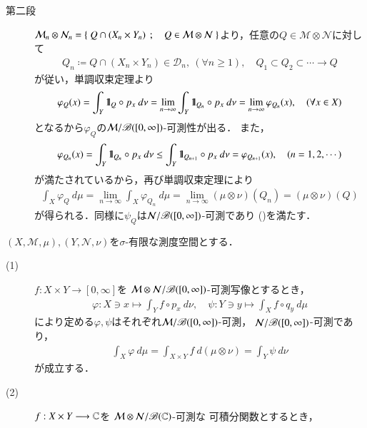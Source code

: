 \begin{prf}
\begin{description}
			\item[第二段]
				$\mathcal{M}_n \otimes \mathcal{N}_n = \left\{\ Q \cap (X_n \times Y_n)\ \, ; \quad Q \in \mathcal{M} \otimes \mathcal{N}\ \right\}$より，任意の$Q \in \mathcal{M} \otimes \mathcal{N}$に対して
				\begin{align}
					Q_n \coloneqq Q \cap (X_n \times Y_n) \in \mathcal{D}_n,
					\ (\forall n \geq 1),
					\quad Q_1 \subset Q_2 \subset \cdots \longrightarrow Q
				\end{align}
				が従い，単調収束定理より
				\begin{align}
					\varphi_Q(x) = \int_Y \mbox{1}\hspace{-0.25em}\mbox{l}_Q \circ p_x\ d\nu
					= \lim_{n \to \infty} \int_Y \mbox{1}\hspace{-0.25em}\mbox{l}_{Q_n} \circ p_x\ d\nu
					= \lim_{n \to \infty} \varphi_{Q_n}(x),
					\quad (\forall x \in X)
				\end{align}
				となるから$\varphi_Q$の$\mathcal{M}/\mathscr{B}([0,\infty])$-可測性が出る．
				また，
				\begin{align}
					\varphi_{Q_n}(x) = \int_Y \defunc_{Q_n} \circ p_x\ d\nu
					\leq \int_Y \defunc_{Q_{n+1}} \circ p_x\ d\nu
					= \varphi_{Q_{n+1}}(x),
					\quad (n=1,2,\cdots)
				\end{align}
				が満たされているから，再び単調収束定理により
				\begin{align}
					\int_X \varphi_Q\ d\mu
					= \lim_{n \to \infty} \int_X \varphi_{Q_n}\ d\mu
					= \lim_{n \to \infty} (\mu \otimes \nu)(Q_n)
					= (\mu \otimes \nu)(Q)
				\end{align}
				が得られる．同様に$\psi_Q$は$\mathcal{N}/\mathscr{B}([0,\infty])$-可測であり
				()を満たす．
				\QED
		\end{description}
	\end{prf}
	
	\begin{screen}
		\begin{thm}[Fubini]
			$(X,\mathcal{M},\mu),(Y,\mathcal{N},\nu)$を$\sigma$-有限な測度空間とする．
			\begin{description}
				\item[(1)]
					$f:X \times Y \longrightarrow [0,\infty]$を
					$\mathcal{M} \otimes \mathcal{N}/\mathscr{B}([0,\infty])$-可測写像とするとき，
					\begin{align}
						\varphi: X \ni x \longmapsto \int_Y f \circ p_x\ d\nu,
						\quad \psi: Y \ni y \longmapsto \int_X f \circ q_y\ d\mu
					\end{align}
					により定める$\varphi,\psi$はそれぞれ$\mathcal{M}/\mathscr{B}([0,\infty])$-可測，
					$\mathcal{N}/\mathscr{B}([0,\infty])$-可測であり，
					\begin{align}
						\int_X \varphi\ d\mu
						= \int_{X \times Y} f\ d(\mu \otimes \nu)
						= \int_Y \psi\ d\nu
					\end{align}
					が成立する．
					
				\item[(2)]
					$f:X \times Y \longrightarrow \mathbb{C}$を
					$\mathcal{M} \otimes \mathcal{N}/\mathscr{B}(\mathbb{C})$-可測な
					可積分関数とするとき，
			\end{description}
		\end{thm}
	\end{screen}
	

